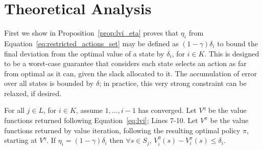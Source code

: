 \section{Theoretical Analysis}
\label{sec:theoretical_analysis}

First we show in Proposition~\ref{prop:lvi_eta} proves that $\eta_i$ from Equation~\ref{eq:restricted_actions_set} may be defined as $(1 - \gamma) \delta_i$ to bound the final deviation from the optimal value of a state by $\delta_i$, for $i \in K$. This is designed to be a worst-case guarantee that considers each state selects an action as far from optimal as it can, given the slack allocated to it. The accumulation of error over all states is bounded by $\delta$; in practice, this very strong constraint can be relaxed, if desired.


\begin{proposition}
    \label{prop:lvi_eta}
    For all $j \in L$, for $i \in K$, assume $1, \ldots, i - 1$ has converged. Let $V^\eta$ be the value functions returned following Equation~\ref{eq:lvi}; Lines 7-10. Let $V^\pi$ be the value functions returned by value iteration, following the resulting optimal policy $\pi$, starting at $V^\eta$. If $\eta_i = (1 - \gamma) \delta_i$ then $\forall s \in S_j$, $V_i^\eta(s) - V_i^\pi(s) \leq \delta_i$.
\end{proposition}

